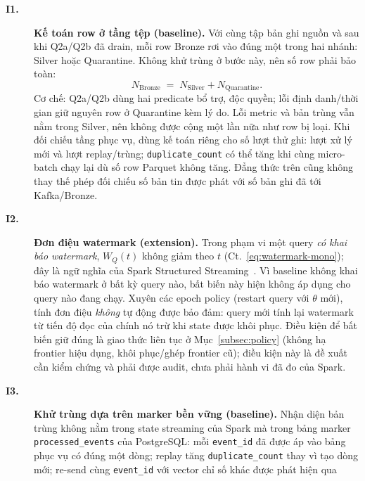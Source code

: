 \begin{description}
  \item[\textbf{I1.}] \textbf{Kế toán row ở tầng tệp (baseline).} Với cùng
        tập bản ghi nguồn và sau khi Q2a/Q2b đã drain, mỗi row Bronze rơi
        vào đúng một trong hai nhánh: Silver hoặc Quarantine. Không khử
        trùng ở bước này, nên số row phải bảo toàn:
        \begin{equation}
          N_{\mathrm{Bronze}} \;=\; N_{\mathrm{Silver}}
          + N_{\mathrm{Quarantine}}.
          \label{eq:accounting}
        \end{equation}
        Cơ chế: Q2a/Q2b dùng hai predicate bổ trợ, độc quyền; lỗi
        định danh/thời gian giữ nguyên row ở Quarantine kèm lý do. Lỗi
        metric và bản trùng vẫn nằm trong Silver, nên không được cộng
        một lần nữa như row bị loại. Khi đối chiếu tầng phục vụ, dùng
        kế toán riêng cho số lượt thử ghi: lượt xử lý mới và lượt
        replay/trùng; \texttt{duplicate\_count} có thể tăng khi cùng
        micro-batch chạy lại dù số row Parquet không tăng. Đẳng thức
        trên cũng không thay thế phép đối chiếu số bản tin được phát với
        số bản ghi đã tới Kafka/Bronze.
  \item[\textbf{I2.}] \textbf{Đơn điệu watermark (extension).} Trong phạm vi một
        query \emph{có khai báo watermark}, $W_Q(t)$ không giảm theo $t$
        (Ct.~\ref{eq:watermark-mono}); đây là ngữ nghĩa của Spark Structured
        Streaming~\cite{spark_docs_4_2}. Vì baseline không khai báo watermark
        ở bất kỳ query nào, bất biến này hiện không áp dụng cho query nào
        đang chạy. Xuyên các epoch policy (restart query với $\theta$ mới),
        tính đơn điệu \emph{không} tự động được bảo đảm: query mới tính lại
        watermark từ tiến độ đọc của chính nó trừ khi state được khôi phục.
        Điều kiện để bất biến giữ đúng là giao thức liên tục ở
        Mục~\ref{subsec:policy} (không hạ frontier hiệu dụng, khôi phục/ghép
        frontier cũ); điều kiện này là đề xuất cần kiểm chứng và phải được
        audit, chưa phải hành vi đã đo của Spark.
  \item[\textbf{I3.}] \textbf{Khử trùng dựa trên marker bền vững (baseline).}
        Nhận diện bản trùng không nằm trong state streaming của Spark mà
        trong bảng marker \texttt{processed\_events} của PostgreSQL: mỗi
        \texttt{event\_id} đã được áp vào bảng phục vụ có đúng một dòng;
        replay tăng \texttt{duplicate\_count} thay vì tạo dòng mới; re-send
        cùng \texttt{event\_id} với vector chỉ số khác được phát hiện qua

\end{description}
